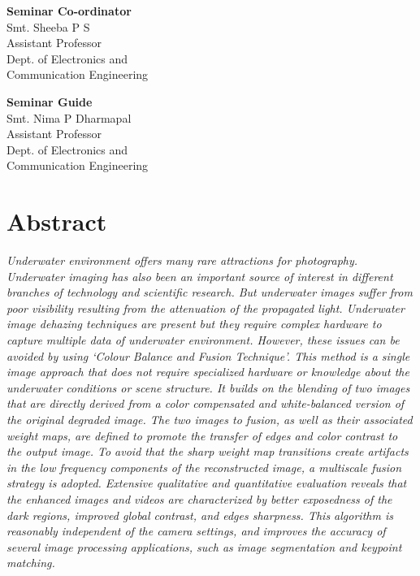 \documentclass[hidelinks, 12pt]{report}
\begin{document}
\vspace{2cm}
\begin{minipage}[t]{10cm}
\flushleft \textbf{Seminar Co-ordinator}\\
Smt. Sheeba P S\\
Assistant Professor\\
Dept. of Electronics and\\
Communication Engineering
\end{minipage}
\vspace{2cm}
\begin{minipage}[t]{6cm}
\flushleft \textbf{Seminar Guide}\\
Smt. Nima P Dharmapal\\
Assistant Professor\\
Dept. of Electronics and\\
Communication Engineering
\end{minipage}

\chapter*{\centering Abstract}
\justify
\textit{\indent
Underwater environment offers many rare attractions for photography. Underwater imaging has also been an important source of interest in different branches of technology and scientific research. But underwater images suffer from poor visibility resulting from the attenuation of the propagated light. Underwater image dehazing techniques are present but they require complex hardware to capture multiple data of underwater environment. However, these issues can be avoided by using `Colour Balance and Fusion Technique'. This method is a single image approach that does not require specialized hardware or knowledge about the underwater conditions or scene structure. It builds on the blending of two images that are directly derived from a color compensated and white-balanced version of the original degraded image. The two images to fusion, as well as their associated weight maps, are defined to promote the transfer of edges and color contrast to the output image. To avoid that the sharp weight map transitions create artifacts in the low frequency components of the reconstructed image, a multiscale fusion strategy is adopted. Extensive qualitative and quantitative evaluation reveals that the enhanced images and videos are characterized by better exposedness of the dark regions, improved global contrast, and edges sharpness. This algorithm is reasonably independent of the camera settings, and improves the accuracy of several image processing applications, such as image segmentation and keypoint matching.}\\
\end{document}
